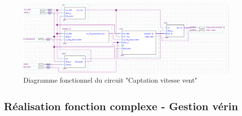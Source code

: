 \begin{figure}[h]
    \begin{center}
      \includegraphics[width=\textwidth]{images/captation.png}
      \caption{Diagramme fonctionnel du circuit "Captation vitesse vent"}
    \end{center}
  \end{figure}

  \newpage

  \subsection{Réalisation fonction complexe - Gestion vérin}